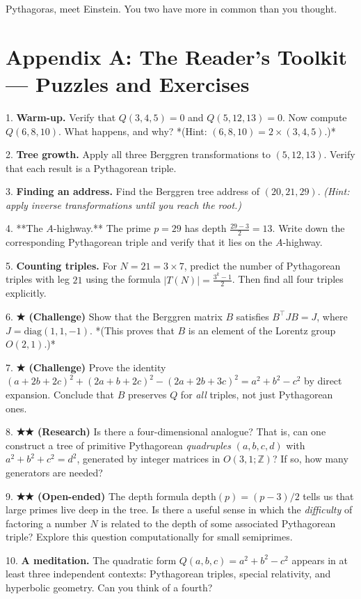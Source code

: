 Pythagoras, meet Einstein. You two have more in common than you thought.

\bigskip

\section*{Appendix A: The Reader's Toolkit --- Puzzles and Exercises}

1. \textbf{Warm-up.} Verify that $Q(3, 4, 5) = 0$ and $Q(5, 12, 13) = 0$. Now compute $Q(6, 8, 10)$. What happens, and why? *(Hint: $(6, 8, 10) = 2 \times (3, 4, 5)$.)*

2. \textbf{Tree growth.} Apply all three Berggren transformations to $(5, 12, 13)$. Verify that each result is a Pythagorean triple.

3. \textbf{Finding an address.} Find the Berggren tree address of $(20, 21, 29)$. \textit{(Hint: apply inverse transformations until you reach the root.)}

4. **The $A$-highway.** The prime $p = 29$ has depth $\frac{29 - 3}{2} = 13$. Write down the corresponding Pythagorean triple and verify that it lies on the $A$-highway.

5. \textbf{Counting triples.} For $N = 21 = 3 \times 7$, predict the number of Pythagorean triples with leg $21$ using the formula $|T(N)| = \frac{3^k - 1}{2}$. Then find all four triples explicitly.

6. \textbf{★ (Challenge)} Show that the Berggren matrix $B$ satisfies $B^\top J B = J$, where $J = \text{diag}(1, 1, -1)$. *(This proves that $B$ is an element of the Lorentz group $O(2,1)$.)*

7. \textbf{★ (Challenge)} Prove the identity $(a + 2b + 2c)^2 + (2a + b + 2c)^2 - (2a + 2b + 3c)^2 = a^2 + b^2 - c^2$ by direct expansion. Conclude that $B$ preserves $Q$ for \textit{all} triples, not just Pythagorean ones.

8. \textbf{★★ (Research)} Is there a four-dimensional analogue? That is, can one construct a tree of primitive Pythagorean \textit{quadruples} $(a, b, c, d)$ with $a^2 + b^2 + c^2 = d^2$, generated by integer matrices in $O(3,1; \mathbb{Z})$? If so, how many generators are needed?

9. \textbf{★★ (Open-ended)} The depth formula $\text{depth}(p) = (p-3)/2$ tells us that large primes live deep in the tree. Is there a useful sense in which the \textit{difficulty} of factoring a number $N$ is related to the depth of some associated Pythagorean triple? Explore this question computationally for small semiprimes.

10. \textbf{A meditation.} The quadratic form $Q(a, b, c) = a^2 + b^2 - c^2$ appears in at least three independent contexts: Pythagorean triples, special relativity, and hyperbolic geometry. Can you think of a fourth?
